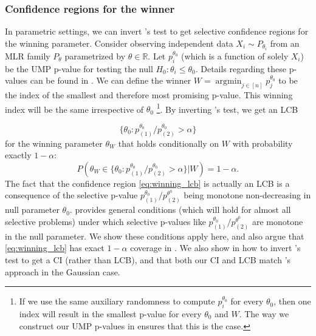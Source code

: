 \documentclass{article}
\DeclareMathOperator*{\argmin}{argmin}
\newcommand{\R}{\mathbb{R}}
\begin{document}
\subsubsection{Confidence regions for the winner}

In parametric settings, we can invert 's test to get selective confidence regions for the winning parameter. Consider observing independent data $X_i \sim P_{\theta_i}$ from an MLR family $P_{\theta}$ parametrized by $\theta \in \R$. Let $p_i^{\theta_0}$ (which is a function of solely $X_i$) be the UMP p-value for testing the null $H_0 : \theta_i \leq \theta_0$. Details regarding these p-values can be found in . We can define the winner $W = \argmin_{j \in [n]} p_j^{\theta_0}$ to be the index of the smallest and therefore most promising p-value. This winning index will be the same irrespective of $\theta_0$  \footnote{If we use the same auxiliary randomness to compute $p_i^{\theta_0}$ for every $\theta_0$, then one index will result in the smallest p-value for every $\theta_0$ and $W$. The way we construct our UMP p-values in  ensures that this is the case. }. By inverting 's test, we get an LCB

\begin{equation}
    \label{eq:winning_lcb}
    \{\theta_0 : p^{\theta_0}_{(1)}/p^{\theta_0}_{(2)} > \alpha  \}
\end{equation}
for the winning parameter $\theta_W$ that holds conditionally on $W$ with probability exactly $1-\alpha$:
\begin{equation*}
    P( \theta_W \in\{\theta_0 : p^{\theta_0}_{(1)}/p^{\theta_0}_{(2)} > \alpha  \} |W ) = 1-\alpha.
\end{equation*}
The fact that the confidence region \eqref{eq:winning_lcb} is actually an LCB is a consequence of the selective p-value $p_{(1)}^{\theta_0}/p^{\theta^0}_{(2)}$ being monotone non-decreasing in null parameter $\theta_0$.  provides general conditions (which will hold for almost all selective problems) under which selective p-values like $p_{(1)}^{\theta_0}/p^{\theta^0}_{(2)}$ are monotone in the null parameter. We show these conditions apply here, and also argue that \eqref{eq:winning_lcb} has exact $1-\alpha$ coverage in . We also show in  how to invert 's test to get a CI (rather than LCB), and that both our CI and LCB match \cite{Fithian2017}'s approach in the Gaussian case. 
\end{document}
